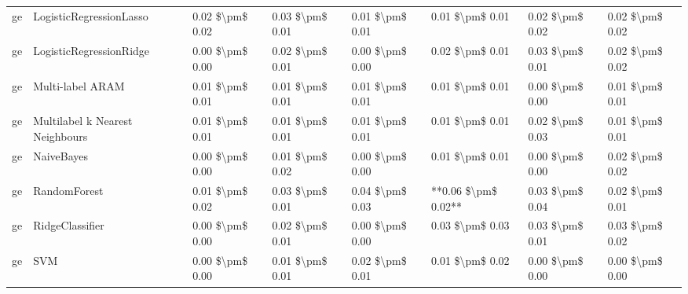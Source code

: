 \begin{tabular}{llllllll}
      ge &         LogisticRegressionLasso & 0.02 \$\textbackslash pm\$ 0.02 &           0.03 \$\textbackslash pm\$ 0.01 &       0.01 \$\textbackslash pm\$ 0.01 &        0.01 \$\textbackslash pm\$ 0.01 &                         0.02 \$\textbackslash pm\$ 0.02 &     0.02 \$\textbackslash pm\$ 0.02 \\
      ge &         LogisticRegressionRidge & 0.00 \$\textbackslash pm\$ 0.00 &           0.02 \$\textbackslash pm\$ 0.01 &       0.00 \$\textbackslash pm\$ 0.00 &        0.02 \$\textbackslash pm\$ 0.01 &                         0.03 \$\textbackslash pm\$ 0.01 &     0.02 \$\textbackslash pm\$ 0.02 \\
      ge &                Multi-label ARAM & 0.01 \$\textbackslash pm\$ 0.01 &           0.01 \$\textbackslash pm\$ 0.01 &       0.01 \$\textbackslash pm\$ 0.01 &        0.01 \$\textbackslash pm\$ 0.01 &                         0.00 \$\textbackslash pm\$ 0.00 &     0.01 \$\textbackslash pm\$ 0.01 \\
      ge & Multilabel k Nearest Neighbours & 0.01 \$\textbackslash pm\$ 0.01 &           0.01 \$\textbackslash pm\$ 0.01 &       0.01 \$\textbackslash pm\$ 0.01 &        0.01 \$\textbackslash pm\$ 0.01 &                         0.02 \$\textbackslash pm\$ 0.03 &     0.01 \$\textbackslash pm\$ 0.01 \\
      ge &                      NaiveBayes & 0.00 \$\textbackslash pm\$ 0.00 &           0.01 \$\textbackslash pm\$ 0.02 &       0.00 \$\textbackslash pm\$ 0.00 &        0.01 \$\textbackslash pm\$ 0.01 &                         0.00 \$\textbackslash pm\$ 0.00 &     0.02 \$\textbackslash pm\$ 0.02 \\
      ge &                    RandomForest & 0.01 \$\textbackslash pm\$ 0.02 &           0.03 \$\textbackslash pm\$ 0.01 &       0.04 \$\textbackslash pm\$ 0.03 &    **0.06 \$\textbackslash pm\$ 0.02** &                         0.03 \$\textbackslash pm\$ 0.04 &     0.02 \$\textbackslash pm\$ 0.01 \\
      ge &                 RidgeClassifier & 0.00 \$\textbackslash pm\$ 0.00 &           0.02 \$\textbackslash pm\$ 0.01 &       0.00 \$\textbackslash pm\$ 0.00 &        0.03 \$\textbackslash pm\$ 0.03 &                         0.03 \$\textbackslash pm\$ 0.01 &     0.03 \$\textbackslash pm\$ 0.02 \\
      ge &                             SVM & 0.00 \$\textbackslash pm\$ 0.00 &           0.01 \$\textbackslash pm\$ 0.01 &       0.02 \$\textbackslash pm\$ 0.01 &        0.01 \$\textbackslash pm\$ 0.02 &                         0.00 \$\textbackslash pm\$ 0.00 &     0.00 \$\textbackslash pm\$ 0.00 \\

\end{tabular}
